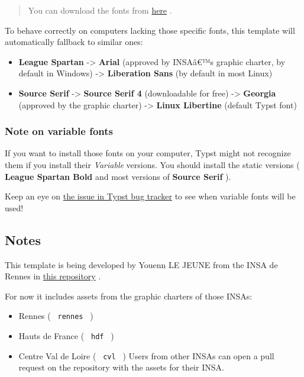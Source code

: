 \begin{quote}
You can download the fonts from
\href{https://github.com/SkytAsul/INSA-Typst-Template/tree/main/fonts}{here}
.
\end{quote}

To behave correctly on computers lacking those specific fonts, this
template will automatically fallback to similar ones:

\begin{itemize}
\tightlist
\item
  \textbf{League Spartan} -\textgreater{} \textbf{Arial} (approved by
  INSAâ€™s graphic charter, by default in Windows) -\textgreater{}
  \textbf{Liberation Sans} (by default in most Linux)
\item
  \textbf{Source Serif} -\textgreater{} \textbf{Source Serif 4}
  (downloadable for free) -\textgreater{} \textbf{Georgia} (approved by
  the graphic charter) -\textgreater{} \textbf{Linux Libertine} (default
  Typst font)
\end{itemize}

\subsubsection{Note on variable fonts}\label{note-on-variable-fonts}

If you want to install those fonts on your computer, Typst might not
recognize them if you install their \emph{Variable} versions. You should
install the static versions ( \textbf{League Spartan Bold} and most
versions of \textbf{Source Serif} ).

Keep an eye on \href{https://github.com/typst/typst/issues/185}{the
issue in Typst bug tracker} to see when variable fonts will be used!

\subsection{Notes}\label{notes}

This template is being developed by Youenn LE JEUNE from the INSA de
Rennes in \href{https://github.com/SkytAsul/INSA-Typst-Template}{this
repository} .

For now it includes assets from the graphic charters of those INSAs:

\begin{itemize}
\tightlist
\item
  Rennes ( \texttt{\ rennes\ } )
\item
  Hauts de France ( \texttt{\ hdf\ } )
\item
  Centre Val de Loire ( \texttt{\ cvl\ } ) Users from other INSAs can
  open a pull request on the repository with the assets for their INSA.
\end{itemize}

